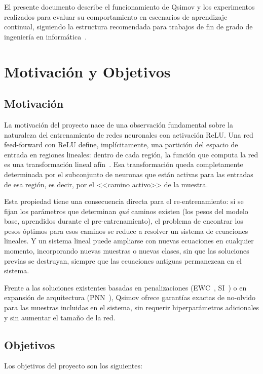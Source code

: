 El presente documento describe el funcionamiento de Qsimov y los experimentos realizados para
evaluar su comportamiento en escenarios de aprendizaje continual, siguiendo la estructura
recomendada para trabajos de fin de grado de ingeniería en informática~\cite{ref2}.

\section{Motivación y Objetivos}

\subsection{Motivación}

La motivación del proyecto nace de una observación fundamental sobre la naturaleza del entrenamiento
de redes neuronales con activación ReLU. Una red feed-forward con ReLU define, implícitamente, una
partición del espacio de entrada en regiones lineales: dentro de cada región, la función que computa
la red es una transformación lineal afín~\cite{ref3}. Esa transformación queda completamente
determinada por el subconjunto de neuronas que están activas para las entradas de esa región, es
decir, por el <<camino activo>> de la muestra.

Esta propiedad tiene una consecuencia directa para el re-entrenamiento: si se fijan los parámetros
que determinan \textit{qué} caminos existen (los pesos del modelo base, aprendidos durante el
pre-entrenamiento), el problema de encontrar los pesos óptimos para esos caminos se reduce a
resolver un sistema de ecuaciones lineales. Y un sistema lineal puede ampliarse con nuevas
ecuaciones en cualquier momento, incorporando nuevas muestras o nuevas clases, sin que las
soluciones previas se destruyan, siempre que las ecuaciones antiguas permanezcan en el sistema.

Frente a las soluciones existentes basadas en penalizaciones (EWC~\cite{ref4}, SI~\cite{ref5}) o
en expansión de arquitectura (PNN~\cite{ref6}), Qsimov ofrece garantías exactas de no-olvido para
las muestras incluidas en el sistema, sin requerir hiperparámetros adicionales y sin aumentar el
tamaño de la red.

\subsection{Objetivos}

Los objetivos del proyecto son los siguientes:

